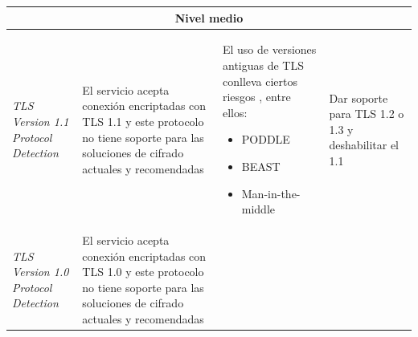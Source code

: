 \documentclass[10pt,a4paper]{article}
\begin{document}
\begin{enumerate}[label=\textbf{\alph*)}]
\begin{longtable}{| p{} | p{} | p{} | p{} |}
\hline 
\multicolumn{4}{|c|}{\textbf{Nivel medio}} \\ 
\hline 
 \textit{TLS Version 1.1 Protocol Detection} & El servicio acepta conexión encriptadas con TLS 1.1 y este protocolo no tiene soporte para las soluciones de cifrado actuales y recomendadas 
& 
El uso de versiones antiguas de TLS conlleva ciertos riesgos \cite{bye}, entre ellos:
\begin{itemize}
\item PODDLE\cite{poddle}
\item BEAST\cite{beast}
\item Man-in-the-middle\cite{mitm}
\end{itemize}
& Dar soporte para TLS 1.2 o 1.3 y deshabilitar el 1.1 \\ 
\hline 
\textit{TLS Version 1.0 Protocol Detection} & El servicio acepta conexión encriptadas con TLS 1.0 y este protocolo no tiene soporte para las soluciones de cifrado actuales y recomendadas 
&


\end{longtable}
\end{enumerate}
\end{document}
